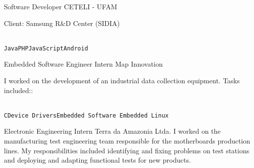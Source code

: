 \documentclass[10pt]{developercv} %
\begin{document}
\begin{entrylist}
  {Software Developer}
  {CETELI - UFAM}
  {
    Client: Samsung R\&D Center (SIDIA)\\
    \begin{contributionlist}
    \end{contributionlist}\\
    \texttt{Java}\slashsep\texttt{PHP}\slashsep\texttt{JavaScript}\slashsep\texttt{Android}}

  {Embedded Software Engineer Intern}
  {Map Innovation}
  {
    I worked on the development of an industrial data collection equipment. 
Tasks included::\\
    \begin{contributionlist}
    \end{contributionlist}\\
\texttt{C}\slashsep\texttt{Device 
Drivers}\slashsep\texttt{Embedded Software}\slashsep\texttt 
{ Embedded Linux }}

  {Electronic Engineering Intern}
  {Terra da Amazonia Ltda.}
  {I worked on the manufacturing test engineering team responsible for the 
motherboards production lines. My responsibilities included identifying and 
fixing problems on test stations and deploying and adapting functional tests for 
new products.}
\end{entrylist}


\begin{minipage}[t]{0.3\textwidth}
  \vspace{-\baselineskip} %


  \begin{skills}
  \end{skills}
\end{minipage}
\end{document}
